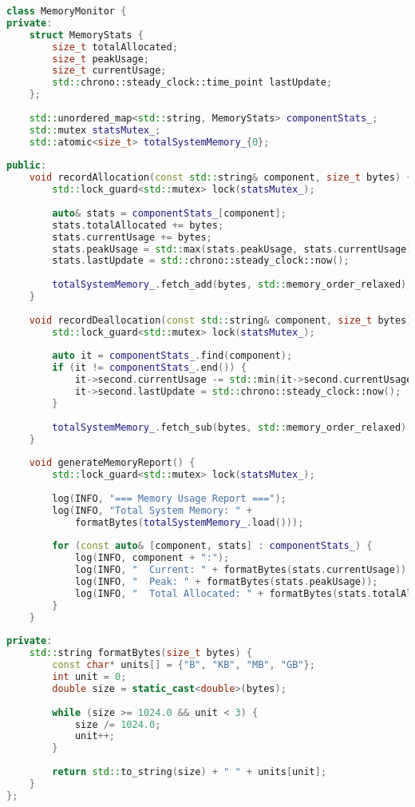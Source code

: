 \begin{lstlisting}[language=C++, caption=Memory Usage Tracking System]
class MemoryMonitor {
private:
    struct MemoryStats {
        size_t totalAllocated;
        size_t peakUsage;
        size_t currentUsage;
        std::chrono::steady_clock::time_point lastUpdate;
    };
    
    std::unordered_map<std::string, MemoryStats> componentStats_;
    std::mutex statsMutex_;
    std::atomic<size_t> totalSystemMemory_{0};
    
public:
    void recordAllocation(const std::string& component, size_t bytes) {
        std::lock_guard<std::mutex> lock(statsMutex_);
        
        auto& stats = componentStats_[component];
        stats.totalAllocated += bytes;
        stats.currentUsage += bytes;
        stats.peakUsage = std::max(stats.peakUsage, stats.currentUsage);
        stats.lastUpdate = std::chrono::steady_clock::now();
        
        totalSystemMemory_.fetch_add(bytes, std::memory_order_relaxed);
    }
    
    void recordDeallocation(const std::string& component, size_t bytes) {
        std::lock_guard<std::mutex> lock(statsMutex_);
        
        auto it = componentStats_.find(component);
        if (it != componentStats_.end()) {
            it->second.currentUsage -= std::min(it->second.currentUsage, bytes);
            it->second.lastUpdate = std::chrono::steady_clock::now();
        }
        
        totalSystemMemory_.fetch_sub(bytes, std::memory_order_relaxed);
    }
    
    void generateMemoryReport() {
        std::lock_guard<std::mutex> lock(statsMutex_);
        
        log(INFO, "=== Memory Usage Report ===");
        log(INFO, "Total System Memory: " + 
            formatBytes(totalSystemMemory_.load()));
        
        for (const auto& [component, stats] : componentStats_) {
            log(INFO, component + ":");
            log(INFO, "  Current: " + formatBytes(stats.currentUsage));
            log(INFO, "  Peak: " + formatBytes(stats.peakUsage));
            log(INFO, "  Total Allocated: " + formatBytes(stats.totalAllocated));
        }
    }
    
private:
    std::string formatBytes(size_t bytes) {
        const char* units[] = {"B", "KB", "MB", "GB"};
        int unit = 0;
        double size = static_cast<double>(bytes);
        
        while (size >= 1024.0 && unit < 3) {
            size /= 1024.0;
            unit++;
        }
        
        return std::to_string(size) + " " + units[unit];
    }
};
\end{lstlisting}

